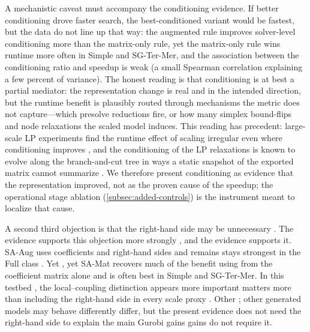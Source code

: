 \documentclass[AMA,Times1COL]{WileyNJDv5} %
\newcommand{\methodAug}{SA-Aug}
\newcommand{\methodMat}{SA-Mat}
\providecommand{\DIFadd}[1]{{\protect\color{blue} \sf #1}} %
\providecommand{\DIFdel}[1]{{\protect\color{red} \scriptsize #1}} %
\providecommand{\DIFaddbegin}{} %
\providecommand{\DIFaddend}{} %
\providecommand{\DIFdelbegin}{} %
\providecommand{\DIFdelend}{} %
\begin{document}
\DIFadd{A mechanistic caveat must accompany the conditioning evidence. If better conditioning drove
faster search, the best-conditioned variant would be fastest, but the data do not line up that
way: the augmented rule improves solver-level conditioning more than the matrix-only rule, yet
the matrix-only rule wins runtime more often in Simple and SG-Ter-Mer, and the association
between the conditioning ratio and speedup is weak (a small Spearman correlation explaining a
few percent of variance). The honest reading is that conditioning is at best a partial
mediator: the representation change is real and in the intended direction, but the runtime
benefit is plausibly routed through mechanisms the metric does not capture---which presolve
reductions fire, or how many simplex bound-flips and node relaxations the scaled model induces.
This reading has precedent: large-scale LP experiments find the runtime effect of scaling
irregular even where conditioning improves \cite{elble2012scaling}, and the conditioning of
the LP relaxations is known to evolve along the branch-and-cut tree in ways a static snapshot
of the exported matrix cannot summarize \cite{miltenberger2018numerics}.
We therefore present conditioning as evidence that the representation improved, not as the
proven cause of the speedup; the operational stage ablation (\cref{subsec:added-controls}) is
the instrument meant to localize that cause}\DIFaddend .

A \DIFdelbegin \DIFdel{second }\DIFdelend \DIFaddbegin \DIFadd{third }\DIFaddend objection is that the right-hand side may be unnecessary\DIFdelbegin \DIFdel{. The evidence supports this objection more strongly}\DIFdelend \DIFaddbegin \DIFadd{, and the evidence supports it}\DIFaddend .
\methodAug{} uses coefficients and right-hand sides and \DIFdelbegin \DIFdel{remains }\DIFdelend \DIFaddbegin \DIFadd{stays }\DIFaddend strongest in the Full class\DIFdelbegin \DIFdel{. Yet }\DIFdelend \DIFaddbegin \DIFadd{, yet
}\DIFaddend \methodMat{} recovers much of the benefit \DIFdelbegin \DIFdel{using
}\DIFdelend \DIFaddbegin \DIFadd{from }\DIFaddend the coefficient matrix alone and is often best
in Simple and SG-Ter-Mer. In this testbed \DIFdelbegin \DIFdel{,
}\DIFdelend the local--coupling distinction \DIFdelbegin \DIFdel{appears more important }\DIFdelend \DIFaddbegin \DIFadd{matters more }\DIFaddend than
including the right-hand side in every scale proxy\DIFdelbegin \DIFdel{. Other }\DIFdelend \DIFaddbegin \DIFadd{; other }\DIFaddend generated models may \DIFdelbegin \DIFdel{behave differently}\DIFdelend \DIFaddbegin \DIFadd{differ}\DIFaddend , but the
present \DIFdelbegin \DIFdel{evidence
does not need the right-hand side to explain the main Gurobi gains }\DIFdelend \DIFaddbegin \DIFadd{gains do not require it}\DIFaddend .
\end{document}
